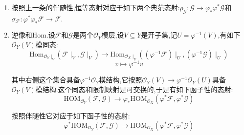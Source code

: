\begin{enumerate}
	这个自然同构也可以写作如下形式,取整体截面得到上面的同构.
	$$\varphi_*\mathrm{HOM}_{\mathscr{O}_X}(\varphi^*\mathscr{G},\mathscr{F})\cong\mathrm{HOM}_{\mathscr{O}_Y}(\mathscr{G},\varphi_*\mathscr{F})$$
	
	另外如果把模层改为代数层,也有类似的伴随性.
	\begin{proof}
		
		只需证明有如下自然同构:
		$$\mathrm{Hom}_{\mathscr{O}_X}(\varphi^*\mathscr{G},\mathscr{F})\cong\mathrm{Hom}_{\varphi^{-1}\mathscr{O}_Y}(\varphi^{-1}\mathscr{G},\mathscr{F})\cong\mathrm{Hom}_{\mathscr{O}_Y}(\mathscr{G},\varphi_*\mathscr{F})$$
		
		这里第一个双射来自如下交换图,第二个双射来自阿贝尔层范畴上$\varphi^{-1}$和$\varphi_*$的伴随性.
		$$\xymatrix{\mathscr{O}_X\otimes_{\varphi^{-1}\mathscr{O}_Y}\varphi^{-1}\mathscr{G}\ar[rr]&&\mathscr{F}\\\mathscr{O}_X\times\varphi^{-1}\mathscr{G}\ar[u]\ar@/_1pc/[urr]&&}$$
	\end{proof}
	\item 按照上一条的伴随性,恒等态射对应于如下两个典范态射:$\rho_{\mathscr{G}}:\mathscr{G}\to\varphi_*\varphi^*\mathscr{G}$和$\sigma_{\mathscr{F}}:\varphi^*\varphi_*\mathscr{F}\to\mathscr{F}$.
	\item 逆像和Hom.设$\mathscr{F}$和$\mathscr{G}$是两个$\mathscr{O}_Y$模层,设$V\subseteq Y$是开子集,记$U=\varphi^{-1}(V)$,有如下$\mathscr{O}_Y(V)$模同态:
	$$\mathrm{Hom}_{\mathscr{O}_Y\mid_V}(\mathscr{F}\mid_V,\mathscr{G}\mid_V)\to\mathrm{Hom}_{\mathscr{O}_X\mid_U}\left((\varphi^{-1}\mathscr{F})\mid_U,(\varphi^{-1}\mathscr{G})\mid_U\right)$$
	$$v\mapsto\varphi^{-1}v$$
	
	其中右侧这个集合具备$\varphi^{-1}\mathscr{O}_Y$模结构,它按照$\mathscr{O}_Y(V)\to\varphi^{-1}\mathscr{O}_Y(U)$具备$\mathscr{O}_Y(V)$模结构.这个同态和限制映射是可交换的,于是有如下函子性的态射:
	$$\mathrm{HOM}_{\mathscr{O}_Y}(\mathscr{F},\mathscr{G})\to\varphi_*\mathrm{HOM}_{\mathscr{O}_X}(\varphi^*\mathscr{F},\varphi^*\mathscr{G})$$
	
	按照伴随性它对应于如下函子性的态射:
	$$\varphi^*\mathrm{HOM}_{\mathscr{O}_Y}(\mathscr{F},\mathscr{G})\to\mathrm{HOM}_{\mathscr{O}_X}(\varphi^*\mathscr{F},\varphi^*\mathscr{G})$$
\end{enumerate}
